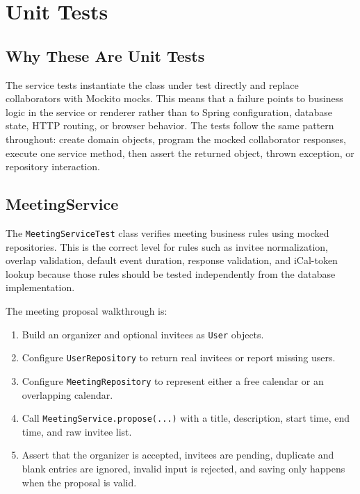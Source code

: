 \chapter{Unit Tests} \label{cap:unit}

\section{Why These Are Unit Tests}

The service tests instantiate the class under test directly and replace collaborators with Mockito mocks. This means that a failure points to business logic in the service or renderer rather than to Spring configuration, database state, HTTP routing, or browser behavior. The tests follow the same pattern throughout: create domain objects, program the mocked collaborator responses, execute one service method, then assert the returned object, thrown exception, or repository interaction.

\section{MeetingService}

The \texttt{MeetingServiceTest} class verifies meeting business rules using mocked repositories. This is the correct level for rules such as invitee normalization, overlap validation, default event duration, response validation, and iCal-token lookup because those rules should be tested independently from the database implementation.

The meeting proposal walkthrough is:

\begin{enumerate}
\item Build an organizer and optional invitees as \texttt{User} objects.
\item Configure \texttt{UserRepository} to return real invitees or report missing users.
\item Configure \texttt{MeetingRepository} to represent either a free calendar or an overlapping calendar.
\item Call \texttt{MeetingService.propose(...)} with a title, description, start time, end time, and raw invitee list.
\item Assert that the organizer is accepted, invitees are pending, duplicate and blank entries are ignored, invalid input is rejected, and saving only happens when the proposal is valid.
\end{enumerate}

